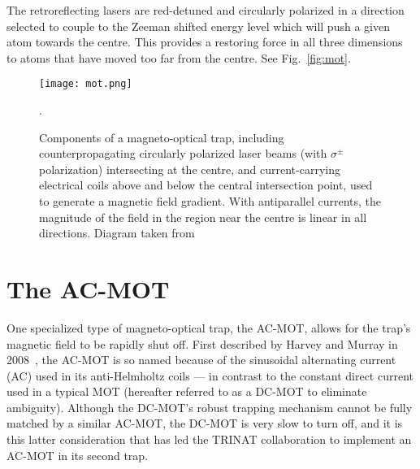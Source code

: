 The retroreflecting lasers are red-detuned and circularly polarized in a direction selected to couple to the Zeeman shifted energy level which will push a given atom towards the centre.  This provides a restoring force in all three dimensions to atoms that have moved too far from the centre.  See Fig.~\ref{fig:mot}.

\begin{figure}[h!!!!!t!b]
	\centering
		\texttt{[image: mot.png]}
		\caption[Components of a Magneto-Optical Trap]{Components of a magneto-optical trap, including counterpropagating circularly polarized laser beams (with $\sigma^\pm$ polarization) intersecting at the centre, and current-carrying electrical coils above and below the central intersection point, used to generate a magnetic field gradient.  With antiparallel currents, the magnitude of the field in the region near the centre is linear in all directions.  Diagram taken from~\cite{thesis}}.
		\label{fig:mot}
    	\label{fig:themot}
\end{figure}


\section{The AC-MOT}
\label{sec:acmot}
%
One specialized type of magneto-optical trap, the AC-MOT, allows for the trap's magnetic field to be rapidly shut off.  First described by Harvey and Murray in 2008~\cite{harveymurray}, the AC-MOT is so named because of the sinusoidal alternating current (AC) used in its anti-Helmholtz coils --- in contrast to the constant direct current used in a typical MOT (hereafter referred to as a DC-MOT to eliminate ambiguity).  Although the DC-MOT's robust trapping mechanism cannot be fully matched by a similar AC-MOT, the DC-MOT is very slow to turn off, and it is this latter consideration that has led the TRINAT collaboration to implement an AC-MOT in its second trap.


